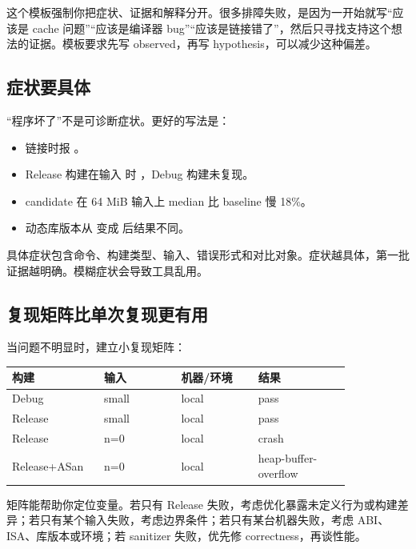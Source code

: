 这个模板强制你把症状、证据和解释分开。很多排障失败，是因为一开始就写“应该是 cache 问题”“应该是编译器 bug”“应该是链接错了”，然后只寻找支持这个想法的证据。模板要求先写 observed，再写 hypothesis，可以减少这种偏差。

\subsection{症状要具体}

“程序坏了”不是可诊断症状。更好的写法是：

\begin{itemize}
  \item {} 链接时报 。
  \item Release 构建在输入  时 ，Debug 构建未复现。
  \item {} candidate 在 64 MiB 输入上 median 比 baseline 慢 18\%。
  \item 动态库版本从  变成  后结果不同。
\end{itemize}

具体症状包含命令、构建类型、输入、错误形式和对比对象。症状越具体，第一批证据越明确。模糊症状会导致工具乱用。

\subsection{复现矩阵比单次复现更有用}

当问题不明显时，建立小复现矩阵：

\begin{center}
\begin{tabular}{p{0.20\linewidth}p{0.20\linewidth}p{0.20\linewidth}p{0.24\linewidth}}
\toprule
构建 & 输入 & 机器/环境 & 结果 \\
\midrule
Debug & small & local & pass \\
Release & small & local & pass \\
Release & n=0 & local & crash \\
Release+ASan & n=0 & local & heap-buffer-overflow \\
\bottomrule
\end{tabular}
\end{center}

矩阵能帮助你定位变量。若只有 Release 失败，考虑优化暴露未定义行为或构建差异；若只有某个输入失败，考虑边界条件；若只有某台机器失败，考虑 ABI、ISA、库版本或环境；若 sanitizer 失败，优先修 correctness，再谈性能。

